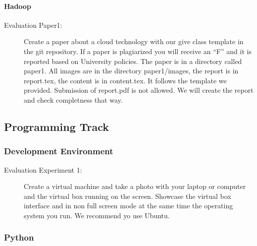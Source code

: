 \paragraph{Hadoop}




\begin{description}
\item[Evaluation Paper1:] Create a paper about a cloud technology with
  our give class template in the git repository. If a paper is
  plagiarized you will receive an ``F'' and it is reported based on
  University policies. The paper is in a directory called paper1. All
  images are in the directory paper1/images, the report is in
  report.tex, the content is in content.tex. It follows the template
  we provided. Submission of report.pdf is not allowed. We will create
  the report and check completness that way.
\end{description}

\subsection{Programming Track}

\subsubsection{Development Environment}



\begin{description}
\item[Evaluation Experiment 1:] Create a virtual machine and take a
  photo with your laptop or computer and the virtual box running on
  the screen. Showcase the virtual box interface and in non full
  screen mode at the same time the operating system you run. We
  recommend yo use Ubuntu.
\end{description}

\subsubsection{Python}



